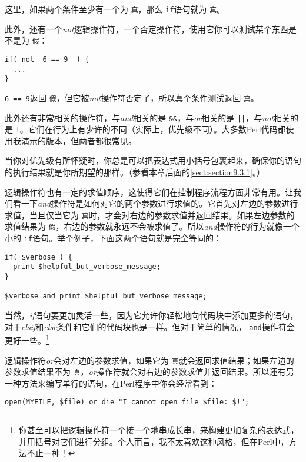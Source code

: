 这里，如果两个条件至少有一个为 \verb|真|，那么 \verb|if|语句就为 \verb|真|。

此外，还有一个\textit{not}逻辑操作符，一个否定操作符，使用它你可以测试某个东西是不是为 \verb|假|：

\begin{lstlisting}
if( not  6 == 9  ) {
  ...
}
\end{lstlisting}

 \verb|6 == 9|返回 \verb|假|，但它被\textit{not}操作符否定了，所以真个条件测试返回 \verb|真|。

此外还有非常相关的操作符，与\textit{and}相关的是 \verb=&&=，与\textit{or}相关的是 \verb=||=，与\textit{not}相关的是 \verb=!=。它们在行为上有少许的不同（实际上，优先级不同）。大多数Perl代码都使用我演示的版本，但两者都很常见。

当你对优先级有所怀疑时，你总是可以把表达式用小括号包裹起来，确保你的语句的执行结果就是你所期望的那样。（参看本章后面的\autoref{sect:section9.3.1}。）

逻辑操作符也有一定的求值顺序，这使得它们在控制程序流程方面非常有用。让我们看一下\textit{and}操作符是如何对它的两个参数进行求值的。它首先对左边的参数进行求值，当且仅当它为 \verb|真|时，才会对右边的参数求值并返回结果。如果左边参数的求值结果为 \verb|假|，右边的参数就永远不会被求值了。所以\textit{and}操作符的行为就像一个小的 \verb|if|语句。举个例子，下面这两个语句就是完全等同的：

\begin{lstlisting}
if( $verbose ) {
  print $helpful_but_verbose_message;
}

$verbose and print $helpful_but_verbose_message;
\end{lstlisting}

当然，\textit{if}语句要更加灵活一些，因为它允许你轻松地向代码块中添加更多的语句，对于\textit{elsif}和\textit{else}条件和它们的代码块也是一样。但对于简单的情况， \verb|and|操作符会更好一些。\footnote{你甚至可以把逻辑操作符一个接一个地串成长串，来构建更加复杂的表达式，并用括号对它们进行分组。个人而言，我不太喜欢这种风格，但在Perl中，方法不止一种！}

逻辑操作符\textit{or}会对左边的参数求值，如果它为 \verb|真|就会返回求值结果；如果左边的参数求值结果不为 \verb|真|，\textit{or}操作符就会对右边的参数求值并返回结果。所以还有另一种方法来编写单行的语句，在Perl程序中你会经常看到：

\begin{lstlisting}
open(MYFILE, $file) or die "I cannot open file $file: $!";
\end{lstlisting}

